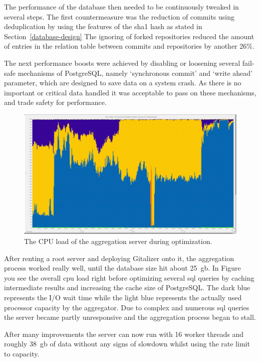The performance of the database then needed to be continuously tweaked in several steps.
The first countermeasure was the reduction of commits using deduplication by using the features of the \ac{sha1} hash as stated in Section~\ref{database-design}
The ignoring of forked repositories reduced the amount of entries in the relation table between commits and repositories by another 26\%.

The next performance boosts were achieved by disabling or loosening several fail-safe mechanisms of PostgreSQL, namely `synchronous commit' and `write ahead' parameter, which are designed to save data on a system crash.
As there is no important or critical data handled it was acceptable to pass on these mechanisms, and trade safety for performance.

\begin{figure}[H]
\includegraphics[scale=0.22]{./graphs/server-graphs/query-refactoring}
\centering
\caption{The CPU load of the aggregation server during optimization.}\label{fig:cpu-load}
\end{figure}

After renting a root server and deploying Gitalizer onto it, the aggregation process worked really well, until the database size hit about 25~\ac{gb}.
In Figure~\label{fig:cpu-load} you see the overall \ac{cpu} load right before optimizing several \ac{sql} queries by caching intermediate results and increasing the cache size of PostgreSQL.
The dark blue represents the I/O wait time while the light blue represents the actually used processor capacity by the aggregator.
Due to complex and numerous \ac{sql} queries the server became partly unresponsive and the aggregation process began to stall.

After many improvements the server can now run with 16 worker threads and roughly 38~\ac{gb} of data without any signs of slowdown whilst using the rate limit to capacity.


